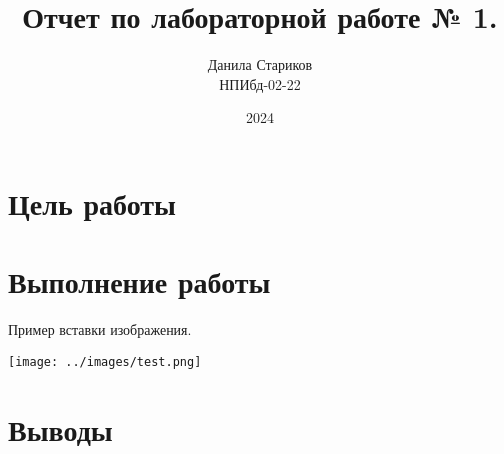 

\title{Отчет по лабораторной работе № 1. \\ [Название]}
\author{Данила Стариков \\ НПИбд-02-22}
\date{2024}



\maketitle
\newpage

\tableofcontents

\newpage
\section{Цель работы}

\newpage
\section{Выполнение работы}
Пример вставки изображения.
\begin{center}
    \centering
    \texttt{[image: ../images/test.png]}
    \label{img:test}
\end{center}


\section{Выводы}


